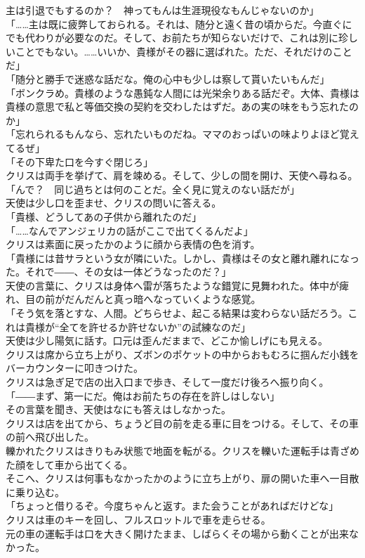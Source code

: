 \documentclass[b5j,10pt,openany]{jsbook}
\begin{document}
主は引退でもするのか？　神ってもんは生涯現役なもんじゃないのか」\\「\ldots{}\ldots{}主は既に疲弊しておられる。それは、随分と遠く昔の頃からだ。今直ぐにでも代わりが必要なのだ。そして、お前たちが知らないだけで、これは別に珍しいことでもない。\ldots{}\ldots{}いいか、貴様がその器に選ばれた。ただ、それだけのことだ」\\「随分と勝手で迷惑な話だな。俺の心中も少しは察して貰いたいもんだ」\\「ボンクラめ。貴様のような愚鈍な人間には光栄余りある話だぞ。大体、貴様は貴様の意思で私と等価交換の契約を交わしたはずだ。あの実の味をもう忘れたのか」\\「忘れられるもんなら、忘れたいものだね。ママのおっぱいの味よりよほど覚えてるぜ」\\「その下卑た口を今すぐ閉じろ」\\クリスは両手を挙げて、肩を竦める。そして、少しの間を開け、天使へ尋ねる。\\「んで？　同じ過ちとは何のことだ。全く見に覚えのない話だが」\\天使は少し口を歪ませ、クリスの問いに答える。\\「貴様、どうしてあの子供から離れたのだ」\\「\ldots{}\ldots{}なんでアンジェリカの話がここで出てくるんだよ」\\クリスは素面に戻ったかのように顔から表情の色を消す。\\「貴様には昔サラという女が隣にいた。しかし、貴様はその女と離れ離れになった。それで――、その女は一体どうなったのだ？」\\天使の言葉に、クリスは身体へ雷が落ちたような錯覚に見舞われた。体中が痺れ、目の前がだんだんと真っ暗へなっていくような感覚。\\「そう気を落とすな、人間。どちらせよ、起こる結果は変わらない話だろう。これは貴様が``全てを許せるか許せないか''の試練なのだ」\\天使は少し陽気に話す。口元は歪んだままで、どこか愉しげにも見える。\\クリスは席から立ち上がり、ズボンのポケットの中からおもむろに掴んだ小銭をバーカウンターに叩きつけた。\\クリスは急ぎ足で店の出入口まで歩き、そして一度だけ後ろへ振り向く。\\「――まず、第一にだ。俺はお前たちの存在を許しはしない」\\その言葉を聞き、天使はなにも答えはしなかった。\\クリスは店を出てから、ちょうど目の前を走る車に目をつける。そして、その車の前へ飛び出した。\\轢かれたクリスはきりもみ状態で地面を転がる。クリスを轢いた運転手は青ざめた顔をして車から出てくる。\\そこへ、クリスは何事もなかったかのように立ち上がり、扉の開いた車へ一目散に乗り込む。\\「ちょっと借りるぞ。今度ちゃんと返す。また会うことがあればだけどな」\\クリスは車のキーを回し、フルスロットルで車を走らせる。\\元の車の運転手は口を大きく開けたまま、しばらくその場から動くことが出来なかった。
\end{document}
